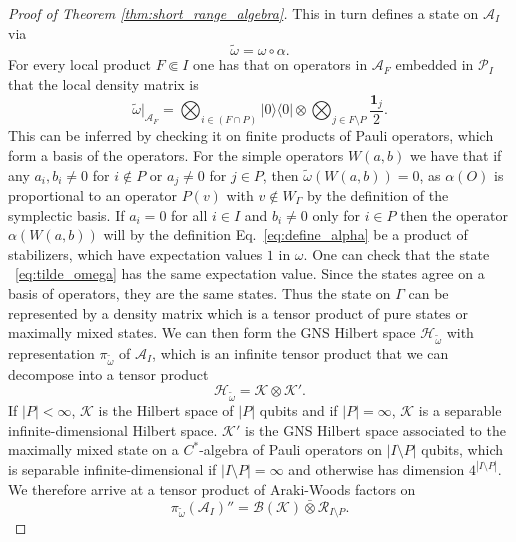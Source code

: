 \documentclass[aps,pra,reprint,superscriptaddress]{revtex4-2}
\newcommand{\cA}{{\mathcal A}}
\newcommand{\cB}{{\mathcal B}}
\newcommand{\cH}{{\mathcal H}}
\newcommand{\cK}{{\mathcal K}}
\newcommand{\cP}{{\mathcal P}}
\newcommand{\cR}{{\mathcal R}}
\renewcommand\a{\alpha}
\newcommand\G{\Gamma}
\newcommand\w{\omega}
\newcommand{\id}{\mathbf 1}
\providecommand{\ket}[1]{\lvert #1\rangle}
\providecommand{\bra}[1]{\langle #1\rvert}
\theoremstyle{definition}
\theoremstyle{remark}
\begin{document}
\begin{proof}[Proof of Theorem \ref{thm:short_range_algebra}]
    This in turn defines a state on $\cA_I$ via
    \begin{equation}
        \tilde{\w} = \w \circ \a.
    \end{equation}
    For every local product $F \Subset I$ one has that on operators in $\cA_F$
    embedded in $\cP_I$ that the local density matrix is
    \begin{equation}\label{eq:tilde_omega}
        \tilde{\w}\vert_{\cA_F} = \bigotimes_{i \in (F \cap P)} \ket{0}\bra{0} \otimes \bigotimes_{j
        \in F \setminus P}
        \frac{\id_j}{2}.
    \end{equation}
    This can be inferred by checking it on finite products of Pauli operators, which form a basis of
    the operators. For the simple operators $W(a,b)$ we have that if any $a_i,b_i \neq 0$ for $i \notin P$ or $a_j \neq 0$ for $j \in P$,
    then $\tilde{\w}(W(a,b)) = 0$, as $\alpha(O)$ is proportional to an operator $P(v)$ with $v \notin W_\G$ by the definition of the symplectic basis. If $a_i = 0$ for all $i\in I$ and $b_i \neq 0$ only for $i \in P$  
    then the operator $\a(W(a,b))$ will by the definition Eq.~\eqref{eq:define_alpha} be a product of stabilizers, which have expectation values $1$ in $\w$. One can check that the state
   ~\eqref{eq:tilde_omega} has the same expectation value. Since the states
    agree on a basis of operators, they are the same states. Thus the state
    on $\G$ can be represented by a density matrix which is a tensor product of
    pure states or maximally mixed states. We can then form the GNS
    Hilbert space $\cH_{\tilde{\w}}$ with representation $\pi_{\tilde{\w}}$ of $\cA_I$, which is an infinite tensor
    product that we can decompose into a tensor product 
    \begin{equation}
        \cH_{\tilde{\w}} = \cK \otimes \cK'.
    \end{equation}
    If $|P| < \infty$, $\cK$ is the Hilbert space of $|P|$ qubits and if $|P| = \infty$, $\cK$ is a separable infinite-dimensional Hilbert space.
    $\cK'$ is the GNS Hilbert space associated to the maximally mixed state on a $C^\ast$-algebra of Pauli operators on $|I\setminus P|$ qubits, which is separable infinite-dimensional if $|I \setminus P| = \infty$ and otherwise has dimension $4^{|I\setminus P|}$.
    We therefore arrive at a tensor product of Araki-Woods factors \cite{ArakiWoods1968} on
    \begin{equation}
        \pi_{\tilde{\w}}(\cA_I)'' = \cB(\cK) \bar{\otimes} \cR_{I\setminus P}.
    \end{equation}

\end{proof}
\end{document}
